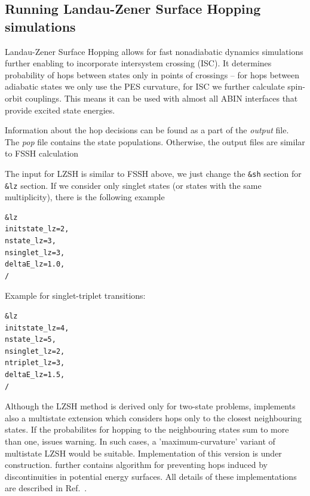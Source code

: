 \subsection{Running Landau-Zener Surface Hopping simulations}
Landau-Zener Surface Hopping allows for fast nonadiabatic dynamics simulations further enabling to incorporate intersystem crossing (ISC).\cite{SuchanLZ} It determines probability of hops between states only in points of crossings -- for hops between adiabatic states we only use the PES curvature, for ISC we further calculate spin-orbit couplings. This means it can be used with almost all ABIN interfaces that provide excited state energies. 

Information about the hop decisions can be found as a part of the \textit{output} file. The \textit{pop} file contains the state populations. Otherwise, the output files are similar to FSSH calculation

The input for LZSH is similar to FSSH above, we just change the \verb|&sh| section for \verb|&lz| section. If we consider only singlet states (or states with the same multiplicity), there is the following example
\begin{verbatim}
&lz
initstate_lz=2,				 
nstate_lz=3,
nsinglet_lz=3,
deltaE_lz=1.0,
/
\end{verbatim}
Example for singlet-triplet transitions:
\begin{verbatim}
&lz
initstate_lz=4,
nstate_lz=5,
nsinglet_lz=2,
ntriplet_lz=3,
deltaE_lz=1.5,
/
\end{verbatim}

Although the LZSH method is derived only for two-state problems, \abin implements also a multistate extension which considers hops only to the closest neighbouring states. If the probabilites for hopping to the neighbouring states sum to more than one, \abin issues warning. In such cases, a 'maximum-curvature' variant of multistate LZSH would be suitable.\cite{Jira2025} Implementation of this version is under construction. \abin further contains algorithm for preventing hops induced by discontinuities in potential energy surfaces. All details of these implementations are described in Ref.~.





